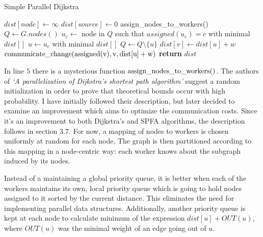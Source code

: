 \documentclass[12pt,a4paper,oneside,openright]{report}
\begin{document}
\begin{algorithm}
\caption{Simple Parallel Dijkstra}\label{pdijkstraagain}
\begin{algorithmic}[1]
    \State $dist[node] \gets \infty$
\EndFor
\State $dist[source] \gets 0$
\State \rm{assign\_nodes\_to\_workers()}
\State $Q \gets G.nodes()$
        \State $u_c \gets$ node in $Q$ such that $assigned(u_c) = c$ with minimal $dist[]$
        \EndFor
        \State $u \gets u_c$ with minimal $dist[]$
        \State $Q \gets Q \setminus \{u\}$
            \State $dist[v] \gets dist[u] + w$
            \State $\rm{communicate\_change(assigned(v)}, v, dist[u] + w)$
        \EndIf
      \EndFor
    \EndWhile
\State \textbf{return} $dist$
\EndProcedure
\end{algorithmic}
\end{algorithm}

In line $5$ there is a mysterious function $\rm{assign\_nodes\_to\_workers()}$. The authors of \textit{`A parallelization of Dijkstra's shortest path algorithm'} \cite{dijkstra} suggest a random initialization in order to prove that theoretical bounds occur with high probability. I have initially followed their description, but later decided to examine an improvement which aims to optimize the communication costs. Since it's an improvement to both Dijkstra's and SPFA algorithms, the description follows in section $3.7$. For now, a mapping of nodes to workers is chosen uniformly at random for each node. The graph is then partitioned according to this mapping in a node-centric way: each worker knows about the subgraph induced by its nodes.

Instead of a maintaining a global priority queue, it is better when each of the workers maintains its own, local priority queue which is going to hold nodes assigned to it sorted by the current distance. This eliminates the need for implementing parallel data structures. Additionally, another priority queue is kept at each node to calculate minimum of the expression $dist[u] + OUT(u)$, where $OUT(u)$ was the minimal weight of an edge going out of $u$. 
\end{document}
